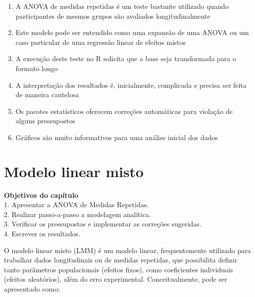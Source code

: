 \documentclass[
]{book}
\providecommand{\tightlist}{%
  \setlength{\itemsep}{0pt}\setlength{\parskip}{0pt}}
\begin{document}
\begin{explore}

\begin{enumerate}
\def\labelenumi{\arabic{enumi}.}
\tightlist
\item
  A ANOVA de medidas repetidas é um teste bastante utilizado quando participantes de mesmos grupos são avaliados longitudinalmente\\
\item
  Este modelo pode ser entendido como uma expansão de uma ANOVA ou um caso particular de uma regressão linear de efeitos mistos\\
\item
  A execução deste teste no R solicita que a base seja transformada para o formato longo\\
\item
  A interpretação dos resultados é, inicialmente, complicada e precisa ser feita de maneira cautelosa\\
\item
  Os pacotes estatísticos oferecem correções automáticas para violação de alguns pressupostos\\
\item
  Gráficos são muito informativos para uma análise inicial dos dados\\
\end{enumerate}

\end{explore}

\hypertarget{modelo-linear-misto}{%
\chapter{Modelo linear misto}\label{modelo-linear-misto}}

\begin{objectives}
\textbf{Objetivos do capítulo}\\
1. Apresentar a ANOVA de Medidas Repetidas.\\
2. Realizar passo-a-passo a modelagem analítica.\\
3. Verificar os pressupostos e implementar as correções sugeridas.\\
4. Escrever os resultados.
\end{objectives}

O modelo linear misto (LMM) é um modelo linear, frequentemente utilizado para trabalhar dados longitudinais ou de medidas repetidas, que possibilita definir tanto parâmetros populacionais (efeitos fixos), como coeficientes individuais (efeitos aleatórios), além do erro experimental. Conceitualmente, pode ser apresentado como:
\end{document}
